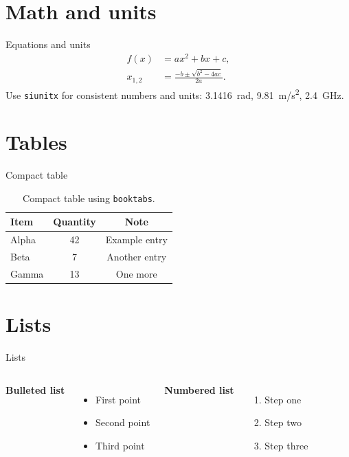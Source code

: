 \documentclass[10pt, aspectratio=169]{beamer}
\begin{document}
\section{Math and units}
\begin{frame}[t]{Equations and units}
\begin{align}
  f(x) &= ax^2 + bx + c, \\
  x_{1,2} &= \frac{-b \pm \sqrt{b^2 - 4ac}}{2a}. \label{eq:quadratic}
\end{align}
Use \texttt{siunitx} for consistent numbers and units: \SI{3.1416}{rad}, \SI{9.81}{m/s^2}, \SI{2.4}{GHz}.
\end{frame}

\section{Tables}
\begin{frame}[t]{Compact table}
\begin{table}
  \centering
  \small
  \begin{tabular}{@{}lcc@{}}
    \toprule
    Item & Quantity & Note \\
    \midrule
    Alpha & \num{42} & Example entry \\
    Beta & \num{7} & Another entry \\
    Gamma & \num{13} & One more \\
    \bottomrule
  \end{tabular}
  \caption{Compact table using \texttt{booktabs}.}
\end{table}
\end{frame}

\section{Lists}
\begin{frame}[t]{Lists}
\begin{columns}[T,onlytextwidth]
  \textbf{Bulleted list}
  \begin{itemize}
    \item First point
    \item Second point
    \item Third point
  \end{itemize}

  \textbf{Numbered list}
  \begin{enumerate}
    \item Step one
    \item Step two
    \item Step three
  \end{enumerate}
\end{columns}
\end{frame}
\end{document}
